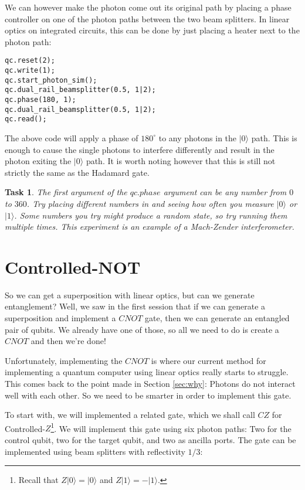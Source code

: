 \documentclass[twocolumn]{article}
\newtheorem{task}{Task}[section]
\begin{document}
We can however make the photon come out its original path by placing a phase controller on one of the photon paths between the two beam splitters. In linear optics on integrated circuits, this can be done by just placing a heater next to the photon path:

\begin{lstlisting}
qc.reset(2);
qc.write(1);
qc.start_photon_sim();
qc.dual_rail_beamsplitter(0.5, 1|2);
qc.phase(180, 1);
qc.dual_rail_beamsplitter(0.5, 1|2);
qc.read();
\end{lstlisting}

The above code will apply a phase of $180^\circ$ to any photons in the $|0\rangle$ path. This is enough to cause the single photons to interfere differently and result in the photon exiting the $|0\rangle$ path. It is worth noting however that this is still not strictly the same as the Hadamard gate.

\begin{task}
The first argument of the $qc.phase$ argument can be any number from $0$ to $360$. Try placing different numbers in and seeing how often you measure $|0\rangle$ or $|1\rangle$. Some numbers you try might produce a random state, so try running them multiple times. This experiment is an example of a Mach-Zender interferometer.
\end{task}

\section{Controlled-NOT}

So we can get a superposition with linear optics, but can we generate entanglement? Well, we saw in the first session that if we can generate a superposition and implement a $CNOT$ gate, then we can generate an entangled pair of qubits. We already have one of those, so all we need to do is create a $CNOT$ and then we're done!

Unfortunately, implementing the $CNOT$ is where our current method for implementing a quantum computer using linear optics really starts to struggle. This comes back to the point made in Section \ref{sec:why}: Photons do not interact well with each other. So we need to be smarter in order to implement this gate.

To start with, we will implemented a related gate, which we shall call $CZ$ for Controlled-$Z$\footnote{Recall that $Z|0\rangle = |0\rangle$ and $Z|1\rangle = -|1\rangle$.}. We will implement this gate using six photon paths: Two for the control qubit, two for the target qubit, and two as ancilla ports. The gate can be implemented using beam splitters with reflectivity $1/3$:
\end{document}
